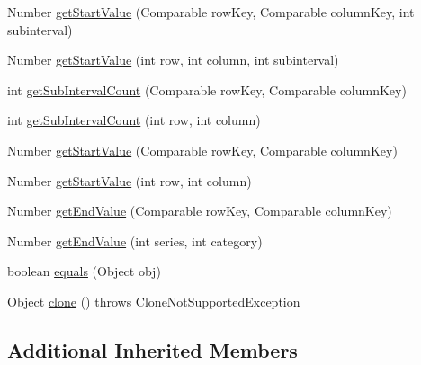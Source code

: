 \begin{DoxyCompactItemize}
\item 
Number \mbox{\hyperlink{classorg_1_1jfree_1_1data_1_1gantt_1_1_sliding_gantt_category_dataset_a39f319042a53c0c261816711bf48974b}{get\+Start\+Value}} (Comparable row\+Key, Comparable column\+Key, int subinterval)
\item 
Number \mbox{\hyperlink{classorg_1_1jfree_1_1data_1_1gantt_1_1_sliding_gantt_category_dataset_a113166fc72732a7f5d199bb1918d8eac}{get\+Start\+Value}} (int row, int column, int subinterval)
\item 
int \mbox{\hyperlink{classorg_1_1jfree_1_1data_1_1gantt_1_1_sliding_gantt_category_dataset_a4b8246a1601e700946bace11c5b0dc33}{get\+Sub\+Interval\+Count}} (Comparable row\+Key, Comparable column\+Key)
\item 
int \mbox{\hyperlink{classorg_1_1jfree_1_1data_1_1gantt_1_1_sliding_gantt_category_dataset_a2d8acd9a0033c1e36ae217dc067931b7}{get\+Sub\+Interval\+Count}} (int row, int column)
\item 
Number \mbox{\hyperlink{classorg_1_1jfree_1_1data_1_1gantt_1_1_sliding_gantt_category_dataset_a64e5005f6d459a1a2a11d9bcc4e1b058}{get\+Start\+Value}} (Comparable row\+Key, Comparable column\+Key)
\item 
Number \mbox{\hyperlink{classorg_1_1jfree_1_1data_1_1gantt_1_1_sliding_gantt_category_dataset_af0c6faccd8c5771ee5d994691b836296}{get\+Start\+Value}} (int row, int column)
\item 
Number \mbox{\hyperlink{classorg_1_1jfree_1_1data_1_1gantt_1_1_sliding_gantt_category_dataset_ad3151981161728bc2ac87c499a8c1ea6}{get\+End\+Value}} (Comparable row\+Key, Comparable column\+Key)
\item 
Number \mbox{\hyperlink{classorg_1_1jfree_1_1data_1_1gantt_1_1_sliding_gantt_category_dataset_a5a3c5ebada67a763d8585d3b7950ebe4}{get\+End\+Value}} (int series, int category)
\item 
boolean \mbox{\hyperlink{classorg_1_1jfree_1_1data_1_1gantt_1_1_sliding_gantt_category_dataset_a90cc95ad8e35317918e6c0cce379c3fa}{equals}} (Object obj)
\item 
Object \mbox{\hyperlink{classorg_1_1jfree_1_1data_1_1gantt_1_1_sliding_gantt_category_dataset_a22a364bcd5a3023264cc2c00ee80827d}{clone}} ()  throws Clone\+Not\+Supported\+Exception 
\end{DoxyCompactItemize}
\subsection*{Additional Inherited Members}


